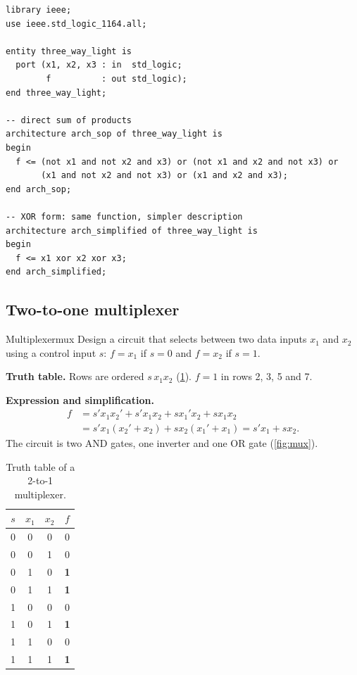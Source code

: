 \begin{lstlisting}[caption={Three-way light: two architectures.},label={lst:threeway}]
library ieee;
use ieee.std_logic_1164.all;

entity three_way_light is
  port (x1, x2, x3 : in  std_logic;
        f          : out std_logic);
end three_way_light;

-- direct sum of products
architecture arch_sop of three_way_light is
begin
  f <= (not x1 and not x2 and x3) or (not x1 and x2 and not x3) or
       (x1 and not x2 and not x3) or (x1 and x2 and x3);
end arch_sop;

-- XOR form: same function, simpler description
architecture arch_simplified of three_way_light is
begin
  f <= x1 xor x2 xor x3;
end arch_simplified;
\end{lstlisting}

\subsection{Two-to-one multiplexer}
\begin{example}{Multiplexer}{mux}
Design a circuit that selects between two data inputs $x_1$ and $x_2$ using a control input $s$: $f=x_1$ if $s=0$ and $f=x_2$ if $s=1$.

\textbf{Truth table.} Rows are ordered $s\,x_1x_2$ (\cref{tab:mux}). $f=1$ in rows 2, 3, 5 and 7.

\textbf{Expression and simplification.}
\begin{align*}
f &= s'x_1x_2' + s'x_1x_2 + sx_1'x_2 + sx_1x_2\\
  &= s'x_1(x_2'+x_2) + sx_2(x_1'+x_1) = s'x_1 + sx_2 .
\end{align*}
The circuit is two AND gates, one inverter and one OR gate (\cref{fig:mux}).
\end{example}

\begin{table}[htbp]
\centering
\caption{Truth table of a 2-to-1 multiplexer.}
\label{tab:mux}
\begin{tabular}{ccc|c}
\toprule
$s$&$x_1$&$x_2$&$f$\\ \midrule
0&0&0&0\\0&0&1&0\\0&1&0&\textbf{1}\\0&1&1&\textbf{1}\\
1&0&0&0\\1&0&1&\textbf{1}\\1&1&0&0\\1&1&1&\textbf{1}\\ \bottomrule
\end{tabular}
\end{table}

